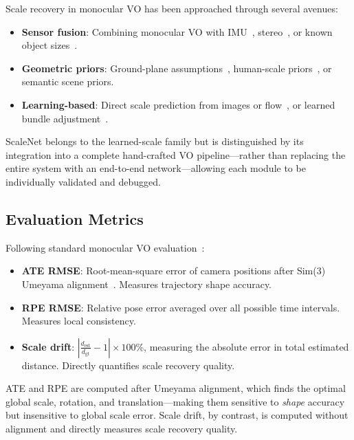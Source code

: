 \documentclass[12pt,a4paper]{article}
\begin{document}
Scale recovery in monocular VO has been approached through several avenues:
\begin{itemize}
    \item \textbf{Sensor fusion}: Combining monocular VO with IMU~\cite{VINS-Mono}, stereo~\cite{ORB-SLAM2}, or known object sizes~\cite{Kinzer2015}.
    \item \textbf{Geometric priors}: Ground-plane assumptions~\cite{ORB-SLAM, Kim2018}, human-scale priors~\cite{Burgard2014}, or semantic scene priors.
    \item \textbf{Learning-based}: Direct scale prediction from images or flow~\cite{DeepVO, UnDeepVO, Huang2020}, or learned bundle adjustment~\cite{LeGraph}.
\end{itemize}

ScaleNet belongs to the learned-scale family but is distinguished by its integration into a complete hand-crafted VO pipeline---rather than replacing the entire system with an end-to-end network---allowing each module to be individually validated and debugged.

\subsection{Evaluation Metrics}

Following standard monocular VO evaluation~\cite{Geiger2012,KITTI}:
\begin{itemize}
    \item \textbf{ATE RMSE}: Root-mean-square error of camera positions after Sim(3) Umeyama alignment~\cite{Umeyama1991}. Measures trajectory shape accuracy.
    \item \textbf{RPE RMSE}: Relative pose error averaged over all possible time intervals. Measures local consistency.
    \item \textbf{Scale drift}: $\left|\frac{d_{\text{est}}}{d_{\text{gt}}} - 1\right| \times 100\%$, measuring the absolute error in total estimated distance. Directly quantifies scale recovery quality.
\end{itemize}

ATE and RPE are computed after Umeyama alignment, which finds the optimal global scale, rotation, and translation---making them sensitive to \textit{shape} accuracy but insensitive to global scale error. Scale drift, by contrast, is computed without alignment and directly measures scale recovery quality.

\end{document}
